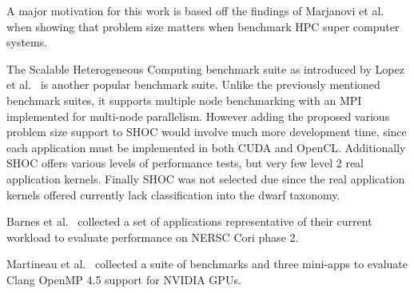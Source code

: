 \documentclass[../document.tex]{subfiles}
\begin{document}
\label{sec:related_work}

A major motivation for this work is based off the findings of Marjanovi et al.~\cite{marjanovic2016hpc} when showing that problem size matters when benchmark HPC super computer systems.

The Scalable Heterogeneous Computing benchmark suite as introduced by Lopez et al.~\cite{lopez2015examining} is another popular benchmark suite.
Unlike the previously mentioned benchmark suites, it supports multiple node benchmarking with an MPI implemented for multi-node parallelism. 
However adding the proposed various problem size support to SHOC would involve much more development time, since each application must be implemented in both CUDA and OpenCL.
Additionally SHOC offers various levels of performance tests, but very few level 2 real application kernels.
Finally SHOC was not selected due since the real application kernels offered currently lack classification into the dwarf taxonomy.

Barnes et al.~\cite{barnes2016evaluating} collected a set of applications representative of their current workload to evaluate performance on NERSC Cori phase 2.

Martineau et al.~\cite{martineau2016performance} collected a suite of benchmarks and three mini-apps to evaluate Clang OpenMP 4.5 support for NVIDIA GPUs.
\end{document}
